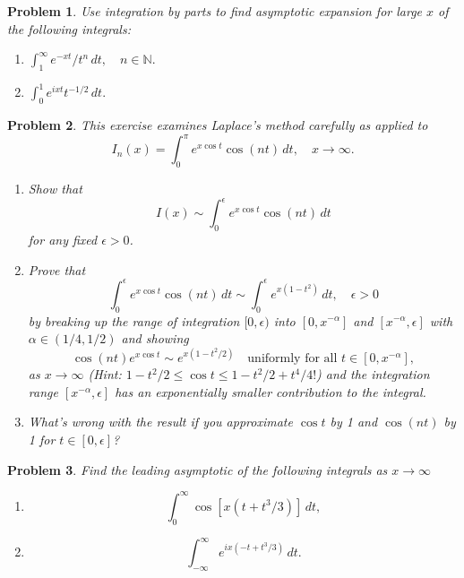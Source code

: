 \documentclass[11pt]{article}
\theoremstyle{problemstyle}
\newtheorem{problem}{Problem}
\begin{document}
\begin{problem}
  Use integration by parts to find asymptotic expansion for large $x$ of
    the following integrals:
  \begin{enumerate}
      \item $\displaystyle \int_1^\infty e^{-xt}/t^n \, dt, \quad n \in
        \mathbb{N}.$
      \item $\displaystyle \int_0^1 e^{ixt} t^{-1/2} \, dt.$
  \end{enumerate}
\end{problem}

\begin{problem}
  This exercise examines Laplace’s method carefully as applied to
  \[
  I_n(x) = \int_0^\pi e^{x \cos t} \cos(nt) \, dt, \quad x \to \infty.
  \]
  \begin{enumerate}
      \item Show that
      \[
      I(x) \sim \int_0^\epsilon e^{x \cos t} \cos(nt) \, dt
      \]
      for any fixed $\epsilon > 0$.
      \item Prove that
      \[
        \int_0^\epsilon e^{x \cos t} \cos(nt) \, dt \sim \int_0^\epsilon e^{x(1
        - t^2)} \, dt, \quad \epsilon > 0
      \]
      by breaking up the range of integration $[0, \epsilon)$ into $[0,
      x^{-\alpha}]$ and $[x^{-\alpha}, \epsilon]$ with $\alpha \in (1/4,
      1/2)$ and showing
      \[
        \cos(nt) e^{x \cos t} \sim e^{x(1 - t^2/2)} \quad \text{uniformly for
        all } t \in [0, x^{-\alpha}],
      \]
      as $x \to \infty$ (Hint: $1 - t^2/2 \leq \cos t \leq 1 - t^2/2 +
      t^4/4!$) and the integration range $[x^{-\alpha}, \epsilon]$ has an
      exponentially smaller contribution to the integral.
      \item What’s wrong with the result if you approximate $\cos t$ by 1 and
        $\cos(nt)$ by 1 for $t \in [0, \epsilon]$?
  \end{enumerate}
\end{problem}

\begin{problem}
  Find the leading asymptotic of the following integrals as $x \to \infty$
  \begin{enumerate}
    \item
      \[
        \int_0^\infty \cos[x(t + t^3/3)] \, dt,
      \]
    \item
      \[
       \int_{-\infty}^\infty e^{ix(-t + t^3/3)} \, dt.
      \]
  \end{enumerate}
\end{problem}
\end{document}
